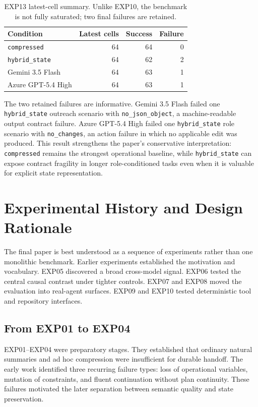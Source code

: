 \documentclass[11pt]{article}
\begin{document}
\begin{table}[h]
\centering
\begin{tabular}{lrrr}
\toprule
Condition & Latest cells & Success & Failure \\
\midrule
\texttt{compressed} & 64 & 64 & 0 \\
\texttt{hybrid\_state} & 64 & 62 & 2 \\
Gemini 3.5 Flash & 64 & 63 & 1 \\
Azure GPT-5.4 High & 64 & 63 & 1 \\
\bottomrule
\end{tabular}
\caption{EXP13 latest-cell summary. Unlike EXP10, the benchmark is not fully saturated; two final failures are retained.}
\label{tab:exp13_summary}
\end{table}

The two retained failures are informative. Gemini 3.5 Flash failed one \texttt{hybrid\_state} outreach scenario with \texttt{no\_json\_object}, a machine-readable output contract failure. Azure GPT-5.4 High failed one \texttt{hybrid\_state} role scenario with \texttt{no\_changes}, an action failure in which no applicable edit was produced. This result strengthens the paper's conservative interpretation: \texttt{compressed} remains the strongest operational baseline, while \texttt{hybrid\_state} can expose contract fragility in longer role-conditioned tasks even when it is valuable for explicit state representation.


\section{Experimental History and Design Rationale}
\label{sec:history}
The final paper is best understood as a sequence of experiments rather than one monolithic benchmark. Earlier experiments established the motivation and vocabulary. EXP05 discovered a broad cross-model signal. EXP06 tested the central causal contrast under tighter controls. EXP07 and EXP08 moved the evaluation into real-agent surfaces. EXP09 and EXP10 tested deterministic tool and repository interfaces.

\subsection{From EXP01 to EXP04}
EXP01--EXP04 were preparatory stages. They established that ordinary natural summaries and ad hoc compression were insufficient for durable handoff. The early work identified three recurring failure types: loss of operational variables, mutation of constraints, and fluent continuation without plan continuity. These failures motivated the later separation between semantic quality and state preservation.
\end{document}
